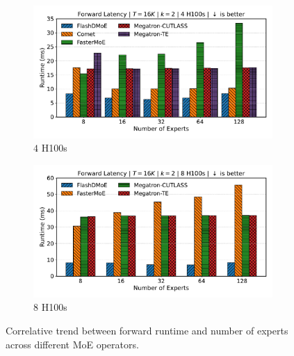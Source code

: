 \begin{figure}[!h]
    \centering
    \begin{subfigure}{0.485\textwidth}
        \centering
        \includegraphics[width=\linewidth, keepaspectratio]{figures/scaling_experts}
        \caption{$4$ H100s}
        \label{sub:4_expert_trend}
    \end{subfigure}
    \begin{subfigure}{0.485\textwidth}
        \centering
        \includegraphics[width=\textwidth, keepaspectratio]{figures/scaling_experts_8}
        \caption{$8$ H100s}
        \label{sub:8_expert_trend}
    \end{subfigure}
    \caption{Correlative trend between forward runtime and number of experts across different MoE operators.}
    \label{fig:expert_trend}
\end{figure}

